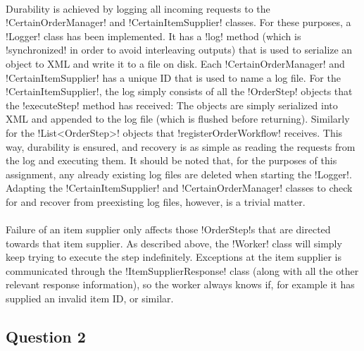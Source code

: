 \documentclass[a4paper, 12pt]{article}
\begin{document}
\paragraph{}

Durability is achieved by logging all incoming requests to the
!CertainOrderManager! and !CertainItemSupplier! classes. For these
purposes, a !Logger! class has been implemented. It has a !log! method
(which is !synchronized! in order to avoid interleaving outputs) that
is used to serialize an object to XML and write it to a file on
disk. Each !CertainOrderManager! and !CertainItemSupplier! has a
unique ID that is used to name a log file. For the
!CertainItemSupplier!, the log simply consists of all the !OrderStep!
objects that the !executeStep! method has received: The objects are
simply serialized into XML and appended to the log file (which is
flushed before returning). Similarly for the !List<OrderStep>! objects
that !registerOrderWorkflow! receives. This way, durability is
ensured, and recovery is as simple as reading the requests from the
log and executing them. It should be noted that, for the purposes of
this assignment, any already existing log files are deleted when
starting the !Logger!. Adapting the !CertainItemSupplier! and
!CertainOrderManager! classes to check for and recover from
preexisting log files, however, is a trivial matter.

\paragraph{}


Failure of an item supplier only affects those !OrderStep!s that are
directed towards that item supplier. As described above, the !Worker!
class will simply keep trying to execute the step
indefinitely. Exceptions at the item supplier is communicated through
the !ItemSupplierResponse! class (along with all the other relevant
response information), so the worker always knows if, for example it
has supplied an invalid item ID, or similar.

\subsection*{Question 2}

\end{document}
